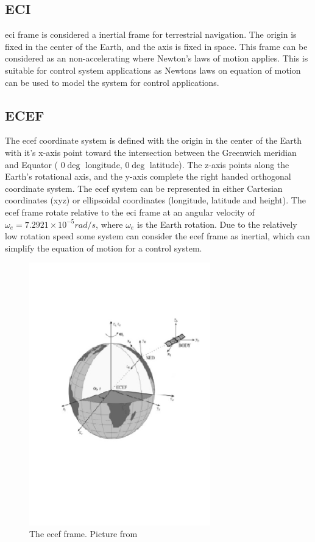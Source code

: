 \subsection{ECI}
\gls{eci} frame is considered a inertial frame for terrestrial navigation. The origin is fixed in the center of the Earth, and the axis is fixed in space. This frame can be considered as an non-accelerating where Newton's laws of motion applies. This is suitable for control system applications as Newtons laws on equation of motion can be used to model the system for control applications.
\subsection{ECEF}\label{ss:ECEF}
The \acrfull{ecef} coordinate system is defined with the origin in the center of the Earth with it's x-axis point toward the intersection between the Greenwich meridian and Equator ( $0\deg $ longitude, $0\deg $ latitude). The z-axis points along the Earth's rotational axis, and the y-axis complete the right handed orthogonal coordinate system. The \gls{ecef} system can be represented in either Cartesian coordinates (xyz) or ellipsoidal coordinates (longitude, latitude and height). The \gls{ecef} frame rotate relative to the \gls{eci} frame at an angular velocity of $\omega_e = 7.2921 \times 10^{-5}rad/s$, where $\omega_e$ is the Earth rotation. Due to the relatively low rotation speed some system can consider the \gls{ecef} frame as inertial, which can simplify the equation of motion for a control system.
\begin{figure}[H]
	\centering
		\includegraphics[width=0.7\textwidth]{figs/ECEF-Frame.jpg}
		\caption{The \gls{ecef} frame. Picture from \citep{fossen2011handbook}}
		\label{figure:ECEF}
\end{figure}
